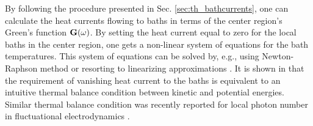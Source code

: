 

By following the procedure presented in Sec. \ref{sec:th_bathcurrents}, one can calculate the heat currents flowing to baths in terms of the center region's Green's function $\mathbf{G}(\omega)$. By setting the heat current equal to zero for the local baths in the center region, one gets a non-linear system of equations for the bath temperatures. This system of equations can be solved by, e.g., using Newton-Raphson method \cite{bandyopadhyay11} or resorting to linearizing approximations \cite{segal09}. It is shown in  that the requirement of vanishing heat current to the baths is equivalent to an intuitive thermal balance condition between kinetic and potential energies. Similar thermal balance condition was recently reported for local photon number in fluctuational electrodynamics \cite{partanen14}. %



